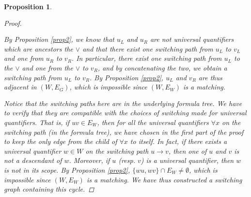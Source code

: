 \documentclass[conference,twosided,10pt]{IEEEtran}
\newtheorem{proposition}[thm]{Proposition}
\theoremstyle{definition}
\newcommand{\cor}{\vee}
\begin{document}
\begin{proposition}
\begin{proof}
\begin{itemize}
    By Proposition \ref{prop2}, we know that $u_L$ and $u_R$ are not
	universal quantifiers which are ancestors the $\cor$
	and that there exist one switching path from $u_L$ to $v_L$ and one
	from $u_R$ to $v_R$. In particular, there exist one switching path from
	$u_L$ to the $\cor$ and one from the $\cor$ to $v_R$, and by
	concatenating the two, we obtain a switching path from $u_L$ to $v_R$. 
	By Proposition \ref{prop2}, $u_L$ and $v_R$ are thus adjacent in $(W,
	E_G)$, which is impossible since $(W, E_W)$ is a matching.
  \end{itemize}
  Notice that the switching paths here are in the underlying formula tree. We
  have to verify that they are compatible with the choices of switching made for
  universal quantifiers. That is, if $uv \in E_W$, then for all the
  universal quantifiers $\forall x$ on the switching path (in the formula
	tree), we have chosen in the first part of the proof to keep the only
	edge from the child of $\forall x$ to itself. In fact, if there exists
	a universal quantifier $w \in W$ on the switching path $u \rightarrow
	v$, then one of $u$ and $v$ is not a descendant of $w$. Moreover, if
	$u$ (resp. $v$) is a universal quantifier, then $w$ is not in its scope.
	By Proposition \ref{prop2}, $\{wu, wv\} \cap E_W \neq \emptyset$, which
	is impossible since $(W, E_W)$ is a matching.
  We have thus constructed a switching graph containing this cycle.
\end{proof}
\end{proposition}
\end{document}
